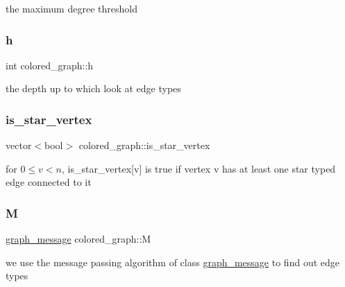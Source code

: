 the maximum degree threshold 

\mbox{\label{classcolored__graph_ae27062a4ee59df2670d3a0c81e85a3fa}} 
\subsubsection{\texorpdfstring{h}{h}}
{\footnotesize\ttfamily int colored\+\_\+graph\+::h}



the depth up to which look at edge types 

\mbox{\label{classcolored__graph_ad41163e970530c7e45878d299f0dc961}} 
\subsubsection{\texorpdfstring{is\+\_\+star\+\_\+vertex}{is\_star\_vertex}}
{\footnotesize\ttfamily vector$<$bool$>$ colored\+\_\+graph\+::is\+\_\+star\+\_\+vertex}



for $0 \leq v < n$, is\+\_\+star\+\_\+vertex\mbox{[}v\mbox{]} is true if vertex v has at least one star typed edge connected to it 

\mbox{\label{classcolored__graph_ab72c568fe12f7c849ca6bffb145aec47}} 
\subsubsection{\texorpdfstring{M}{M}}
{\footnotesize\ttfamily \hyperlink{classgraph__message}{graph\+\_\+message} colored\+\_\+graph\+::M}



we use the message passing algorithm of class \hyperlink{classgraph__message}{graph\+\_\+message} to find out edge types 

\mbox{\label{classcolored__graph_a90ece8eb1fec52f3f41549ab527c1d5b}} 
